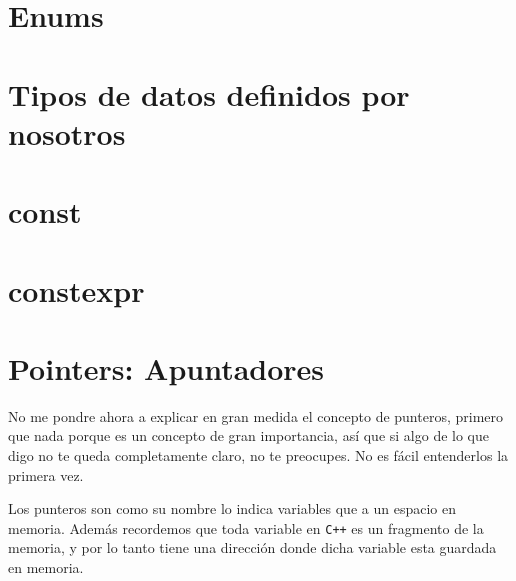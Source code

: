 \documentclass[12pt, fleqn]{report}                             %
\newcommand \Quote              {\qq}                           %
\theoremstyle{break}                                            %
\newcommand{\textCode}[1]  { \texttt{#1} }                      %
\newcommand \Cpp  {\textCode{C++} }                               %
\begin{document}
        \section{Enums}



        \clearpage
        \section{Tipos de datos definidos por nosotros}

        \section{const}

        \section{constexpr}
        
        \clearpage
        \section{Pointers: Apuntadores}

            No me pondre ahora a explicar en gran medida el concepto de punteros, 
            primero que nada porque es un concepto de gran importancia, así que si algo de lo que
            digo no te queda completamente claro, no te preocupes. No es fácil entenderlos la primera vez.

            Los punteros son como su nombre lo indica variables que \Quote{apuntan} a un espacio en memoria.
            Además recordemos que toda variable en \Cpp es un fragmento de la memoria, y por lo tanto tiene
            una dirección donde dicha variable esta guardada en memoria.
\end{document}
